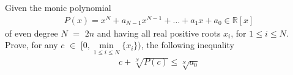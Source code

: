 Given the monic polynomial
\begin{align*} P(x) = x^N +a_{N-1}x^{N-1} + \ldots + a_1 x + a_0 \in \mathbb{R}[x] \end{align*}of even degree $N$ $=$ $2n$ and having all real positive roots $x_i$, for $1 \le i \le N$. Prove, for any $c$ $\in$ $[0, \underset{1 \le i \le N}{\min} \{x_i \} )$, the following inequality
\begin{align*} c + \sqrt[N]{P(c)} \le \sqrt[N]{a_0} \end{align*}